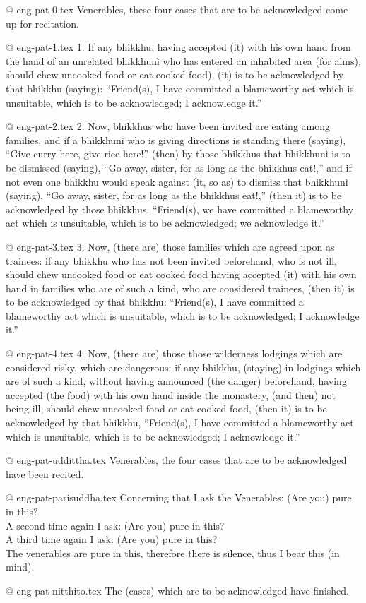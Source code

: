 @ eng-pat-0.tex
Venerables, these four cases that are to be acknowledged come up for recitation.

@ eng-pat-1.tex
1. If any bhikkhu, having accepted (it) with his own hand from the hand of an unrelated bhikkhunì who has entered an inhabited area (for alms), should chew uncooked food or eat cooked food), (it) is to be acknowledged by that bhikkhu (saying): “Friend(s), I have committed a blameworthy act which is unsuitable, which is to be acknowledged; I acknowledge it.”

@ eng-pat-2.tex
2. Now, bhikkhus who have been invited are eating among families, and if a bhikkhunì who is giving directions is standing there (saying), “Give curry here, give rice here!” (then) by those bhikkhus that bhikkhunì is to be dismissed (saying), “Go away, sister, for as long as the bhikkhus eat!,” and if not even one bhikkhu would speak against (it, so as) to dismiss that bhikkhunì (saying), “Go away, sister, for as long as the bhikkhus eat!,” (then it) is to be acknowledged by those bhikkhus, “Friend(s), we have committed a blameworthy act which is unsuitable, which is to be acknowledged; we acknowledge it.”

@ eng-pat-3.tex
3. Now, (there are) those families which are agreed upon as trainees: if any bhikkhu who has not been invited beforehand, who is not ill, should chew uncooked food or eat cooked food having accepted (it) with his own hand in families who are of such a kind, who are considered trainees, (then it) is to be acknowledged by that bhikkhu: “Friend(s), I have committed a blameworthy act which is unsuitable, which is to be acknowledged; I acknowledge it.”

@ eng-pat-4.tex
4. Now, (there are) those those wilderness lodgings which are considered risky, which are dangerous: if any bhikkhu, (staying) in lodgings which are of such a kind, without having announced (the danger) beforehand, having accepted (the food) with his own hand inside the monastery, (and then) not being ill, should chew uncooked food or eat cooked food, (then it) is to be acknowledged by that bhikkhu, “Friend(s), I have committed a blameworthy act which is unsuitable, which is to be acknowledged; I acknowledge it.”

@ eng-pat-uddittha.tex
Venerables, the four cases that are to be acknowledged have been recited.

@ eng-pat-parisuddha.tex
Concerning that I ask the Venerables: (Are you) pure in this?\\
A second time again I ask: (Are you) pure in this?\\
A third time again I ask: (Are you) pure in this?\\
The venerables are pure in this, therefore there is silence, thus I bear this (in mind).

@ eng-pat-nitthito.tex
The (cases) which are to be acknowledged have finished.
